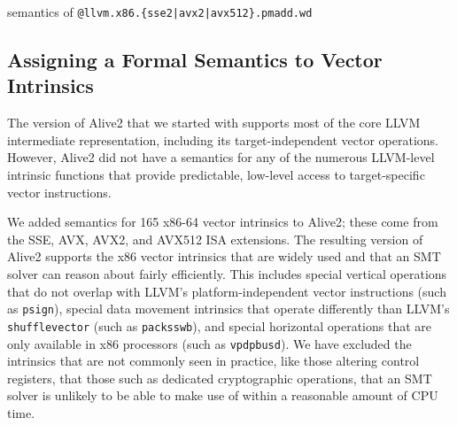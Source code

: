 \begin{algorithm}[tbp]
    \caption{semantics of \texttt{@llvm.x86.\{sse2|avx2|avx512\}.pmadd.wd}}
    \label{semantic:pmadd}
    \begin{algorithmic}[1]
    \Else
    \EndIf
    \EndFor
    \end{algorithmic}
\end{algorithm}


\subsection{Assigning a Formal Semantics to Vector Intrinsics}

The version of Alive2 that we started with supports most of the core
LLVM intermediate representation, including its target-independent
vector operations.
%
However, Alive2 did not have a semantics for any of the numerous
LLVM-level intrinsic functions that provide predictable, low-level
access to target-specific vector instructions.


We added semantics for 165 x86-64 vector intrinsics to Alive2; these
come from the SSE, AVX, AVX2, and AVX512 ISA extensions.
%
The resulting version of Alive2 supports the x86 vector intrinsics
that are widely used and that an SMT solver can reason about fairly
efficiently.
%
This includes special vertical operations that do not overlap with
LLVM's platform-independent vector instructions (such as
\texttt{psign}), special data movement intrinsics that operate
differently than LLVM's \texttt{shufflevector} (such as
\texttt{packsswb}), and special horizontal operations that are only
available in x86 processors (such as \texttt{vpdpbusd}). We have
excluded the intrinsics that are not commonly seen in practice, like
those altering control registers, that those such as dedicated
cryptographic operations, that an SMT solver is unlikely to be able to
make use of within a reasonable amount of CPU time.


